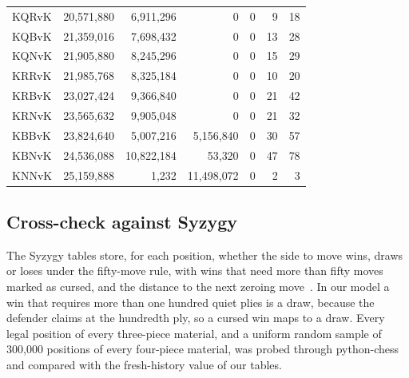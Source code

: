 \documentclass[journal]{IEEEtran}
\theoremstyle{definition}
\theoremstyle{remark}
\begin{document}
\begin{table}[t]
\begin{tabular}{@{}lrrrrrr@{}}
KQRvK & 20{,}571{,}880 & 6{,}911{,}296 & 0 & 0 & 9 & 18\\
KQBvK & 21{,}359{,}016 & 7{,}698{,}432 & 0 & 0 & 13 & 28\\
KQNvK & 21{,}905{,}880 & 8{,}245{,}296 & 0 & 0 & 15 & 29\\
KRRvK & 21{,}985{,}768 & 8{,}325{,}184 & 0 & 0 & 10 & 20\\
KRBvK & 23{,}027{,}424 & 9{,}366{,}840 & 0 & 0 & 21 & 42\\
KRNvK & 23{,}565{,}632 & 9{,}905{,}048 & 0 & 0 & 21 & 32\\
KBBvK & 23{,}824{,}640 & 5{,}007{,}216 & 5{,}156{,}840 & 0 & 30 & 57\\
KBNvK & 24{,}536{,}088 & 10{,}822{,}184 & 53{,}320 & 0 & 47 & 78\\
KNNvK & 25{,}159{,}888 & 1{,}232 & 11{,}498{,}072 & 0 & 2 & 3\\
\bottomrule
\end{tabular}
\end{table}

\subsection{Cross-check against Syzygy}
The Syzygy tables store, for each position, whether the side to move wins, draws or loses under the fifty-move rule, with wins that need more than fifty moves marked as cursed, and the distance to the next zeroing move~\cite{syzygy}. In our model a win that requires more than one hundred quiet plies is a draw, because the defender claims at the hundredth ply, so a cursed win maps to a draw. Every legal position of every three-piece material, and a uniform random sample of 300{,}000 positions of every four-piece material, was probed through python-chess and compared with the fresh-history value of our tables.
\end{document}
